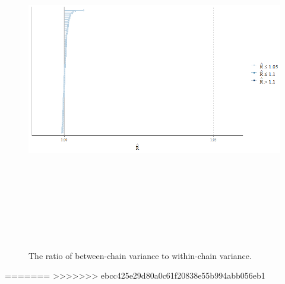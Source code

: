 \begin{figure}
	\centering
	\includegraphics[width=15cm,height=15cm,keepaspectratio]{graphics/rhat.png}
	\caption{The ratio of between-chain variance to within-chain variance.}
	\label{fig:rhat}
\end{figure}
=======
>>>>>>> ebcc425e29d80a0c61f20838e55b994abb056eb1

